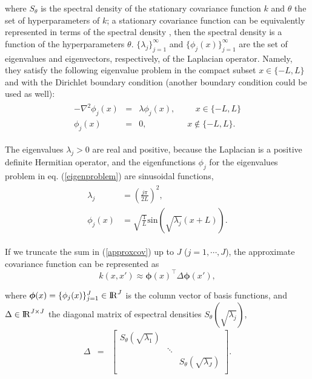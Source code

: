 \documentclass[]{interact}
\theoremstyle{plain}%
\theoremstyle{definition}
\theoremstyle{remark}
\begin{document}
\noindent where $S_{\theta}$ is the spectral density of the stationary covariance function $k$ and $\theta$ the set of hyperparameters of $k$; a stationary covariance function can be equivalently represented in terms of the spectral density \citep{rasmussen2006gaussian}, then the spectral density is a function of the hyperparameters $\theta$. $\{\lambda_j\}_{j=1}^{\infty}$ and $\{\phi_j(x)\}_{j=1}^{\infty}$ are the set of eigenvalues and eigenvectors, respectively, of the Laplacian operator. Namely, they satisfy the following eigenvalue problem in the compact subset $x \in \{-L,L\}$ and with the Dirichlet boundary condition (another boundary condition could be used as well):
%
\begin{eqnarray}\label{eigenproblem}
\begin{split}
-\nabla^2 \phi_j(x)&=&\lambda \phi_j(x), \hspace{1cm}  x\in \{-L,L\} \\ 
\phi_j(x)&=&0, \hspace{2cm} x\notin \{-L,L\}.
\end{split}
\end{eqnarray} 

\noindent The eigenvalues $\lambda_j>0$ are real and positive, because the Laplacian is a positive definite Hermitian operator, and the eigenfunctions $\phi_j$ for the eigenvalues problem in eq. (\ref{eigenproblem}) are sinusoidal functions,
%
\begin{eqnarray}\label{bf&lambda}
\begin{split}
\lambda_j&=\left(\frac{j\pi}{2L}\right)^2, \\
\phi_j(x)&=\sqrt{\frac{1}{L}} \text{sin}\left(\sqrt{\lambda_j}(x+L)\right).
\end{split}
\end{eqnarray}

If we truncate the sum in (\ref{approxcov}) up to $J$ ($j=1,\cdots,J$), the approximate covariance function can be represented as
%
\begin{equation}
k(x,x') \approx \boldsymbol{\phi}(x)^\intercal \Delta \boldsymbol{\phi}(x'), \nonumber
\end{equation}

\noindent where $\boldsymbol{\phi}(x)=\{\phi_j(x)\}_{j=1}^{J} \in {\rm I\!R}^{J}$ is the column vector of basis functions, and $\Delta  \in {\rm I\!R}^{J\times J}$ the diagonal matrix of espectral densities $S_{\theta}(\sqrt{\lambda_j})$, 
%
\begin{eqnarray}
\Delta &=&  \begin{bmatrix}
    S_{\theta}(\sqrt{\lambda_1}) & & \\
    & \ddots & \nonumber \\
    & & S_{\theta}(\sqrt{\lambda_J}) \\
  \end{bmatrix}.
\end{eqnarray}
\end{document}
